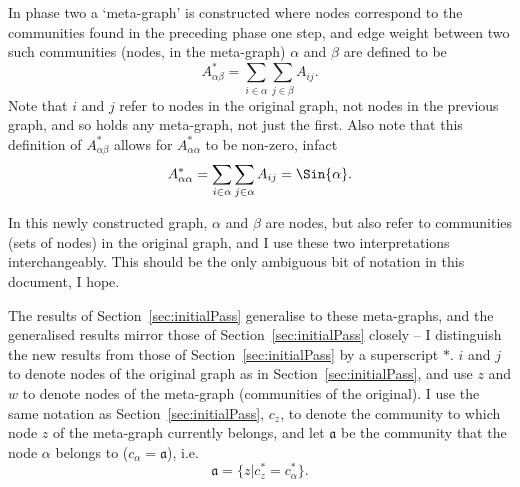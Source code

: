 \documentclass{article}
\begin{document}
In phase two a `meta-graph' is constructed where nodes correspond to 
the communities found in the preceding phase one step, and edge weight
between two such communities (nodes, in the meta-graph)
$\alpha$ and $\beta$ are defined to be
\begin{equation}
	A_{\alpha \beta}^* = \sum_{i \in \alpha}\sum_{j \in \beta}A_{ij}.
	\label{eqn:Aij*}
\end{equation} 
Note that $i$ and $j$ refer to nodes in the original graph, not nodes 
in the previous graph, and so holds any meta-graph, not just the first.
Also note that this definition of $A^*_{\alpha \beta}$ allows for 
$A^*_{\alpha \alpha}$ to be non-zero, infact
\begin{equation}
A_{\alpha \alpha}^* = \sum_{i \in \alpha}\sum_{j \in \alpha}A_{ij} = \Sin{\alpha}.
\end{equation} 

In this newly constructed graph, $\alpha$ and $\beta$ are nodes, but 
also refer to communities (sets of nodes) in the original graph, and I 
use these two interpretations interchangeably.
This should be the only ambiguous bit of notation in this document, I hope.

The results of Section~\ref{sec:initialPass} generalise to these meta-graphs,
and the generalised results mirror those of Section~\ref{sec:initialPass} closely
-- I distinguish the new results from those of Section~\ref{sec:initialPass} by a 
superscript $*$.
$i$ and $j$ to denote nodes of the original graph as in Section~\ref{sec:initialPass}, 
and use $z$ and $w$ to denote nodes of the meta-graph (communities of the original).
I use the same notation as Section~\ref{sec:initialPass}, $c_z$, to 
denote the community to which node $z$ of the meta-graph currently belongs, 
and let $\mathfrak{a}$ be the community that the node $\alpha$ belongs to 
($c_{\alpha} = \mathfrak{a}$), i.e.
\begin{equation}
	\mathfrak{a} = \{z | c_z^* = c_{\alpha}^* \}.
\end{equation}
\end{document}
